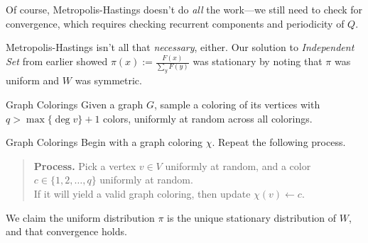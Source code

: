 Of course, Metropolis-Hastings doesn't do \emph{all} the work---we still need to check for convergence, which requires checking recurrent components and periodicity of $Q$.

\begin{remark}
    Metropolis-Hastings isn't all that \emph{necessary}, either.  Our solution to \emph{Independent Set} from earlier showed $\pi(x) := \frac{F(x)}{\sum_y F(y)}$ was stationary by noting that $\pi$ was uniform and $W$ was symmetric.
\end{remark}

\begin{problem}{Graph Colorings}
    Given a graph $G$, sample a coloring of its vertices with $q > \max\{\deg v\} + 1$ colors, uniformly at random across all colorings.
\end{problem}

\begin{solution}{Graph Colorings}
    Begin with a graph coloring $\chi$.  Repeat the following process.
    \begin{quote}
        \textbf{Process.} Pick a vertex $v \in V$ uniformly at random, and a color $c \in \{1, 2, \dots, q\}$ uniformly at random. \\ If it will yield a valid graph coloring, then update $\chi(v) \leftarrow c$.
    \end{quote}
    We claim the uniform distribution $\pi$ is the unique stationary distribution of $W$, and that convergence holds.
\end{solution}

